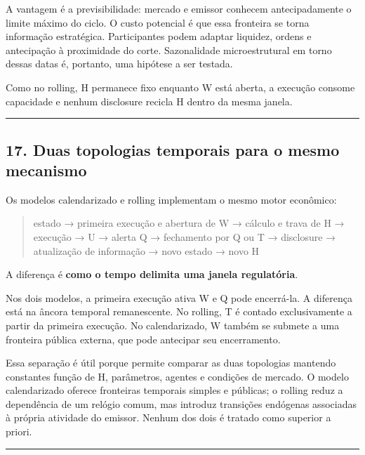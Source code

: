 \documentclass[
  a4paper,
]{article}
\begin{document}
A vantagem é a previsibilidade: mercado e emissor conhecem
antecipadamente o limite máximo do ciclo. O custo potencial é que essa
fronteira se torna informação estratégica. Participantes podem adaptar
liquidez, ordens e antecipação à proximidade do corte. Sazonalidade
microestrutural em torno dessas datas é, portanto, uma hipótese a ser
testada.

Como no rolling, H permanece fixo enquanto W está aberta, a execução
consome capacidade e nenhum disclosure recicla H dentro da mesma janela.

\begin{center}\rule{0.5\linewidth}{0.5pt}\end{center}

\hypertarget{17-o-que-realmente-diferencia-as-duas-branches}{}

\hypertarget{17-duas-topologias-temporais-para-o-mesmo-mecanismo}{%
\subsection{17. Duas topologias temporais para o mesmo
mecanismo}\label{17-duas-topologias-temporais-para-o-mesmo-mecanismo}}

Os modelos calendarizado e rolling implementam o mesmo motor econômico:

\begin{quote}
estado → primeira execução e abertura de W → cálculo e trava de H →
execução → U → alerta Q → fechamento por Q ou T → disclosure →
atualização de informação → novo estado → novo H
\end{quote}

A diferença é \textbf{como o tempo delimita uma janela regulatória}.

Nos dois modelos, a primeira execução ativa W e Q pode encerrá-la. A
diferença está na âncora temporal remanescente. No rolling, T é contado
exclusivamente a partir da primeira execução. No calendarizado, W também
se submete a uma fronteira pública externa, que pode antecipar seu
encerramento.

Essa separação é útil porque permite comparar as duas topologias
mantendo constantes função de H, parâmetros, agentes e condições de
mercado. O modelo calendarizado oferece fronteiras temporais simples e
públicas; o rolling reduz a dependência de um relógio comum, mas
introduz transições endógenas associadas à própria atividade do emissor.
Nenhum dos dois é tratado como superior a priori.

\begin{center}\rule{0.5\linewidth}{0.5pt}\end{center}
\end{document}
